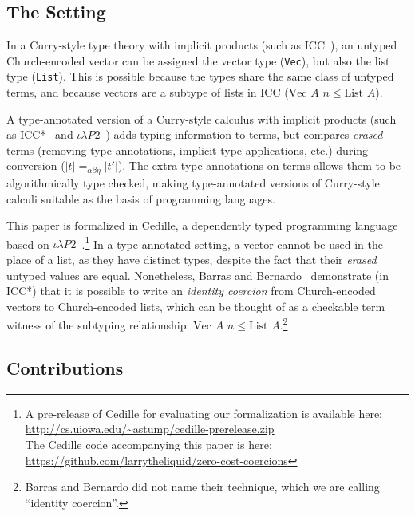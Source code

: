 \documentclass[a4paper,envcountsame,envcountsect]{llncs}
\newcommand{\earg}[1]{\,\,#1}
\newcommand{\subtp}[0]{\leq}
\newcommand{\cdle}[0]{\ensuremath{\iota \lambda P2}~}
\newcommand{\erase}[1]{\ensuremath{\lvert #1 \rvert}}
\newcommand{\name}[1]{\textrm{#1}}
\begin{document}
\subsection{The Setting}

In a Curry-style type theory with implicit
products (such as ICC~\cite{miquel:implicit}),
an untyped Church-encoded vector can be assigned
the vector type (\texttt{Vec}),
but also the list type (\texttt{List}).
This is possible because the types share the same class of untyped
terms, and because vectors are a subtype of lists in ICC
($\name{Vec} \earg A \earg n \subtp \name{List} \earg A$).

A type-annotated version of a Curry-style
calculus with implicit products
(such as ICC*~\cite{barras:implicit} and
\cdle\cite{stump17b}) adds typing information to terms, but compares
\textit{erased} terms (removing type annotations, implicit type
applications, etc.) during conversion
($\erase{t} =_{\alpha\beta\eta} \erase{t'}$).
The extra type annotations on terms allows them
to be algorithmically type checked, making type-annotated versions of
Curry-style calculi suitable as the basis of programming languages.

This paper is formalized in Cedille, a dependently typed programming
language based on \cdle.\footnote{\raggedright{A pre-release of Cedille for
evaluating our formalization is available here:\\
\url{http://cs.uiowa.edu/~astump/cedille-prerelease.zip}}\\
  The Cedille code accompanying this paper is here:\\
  \url{https://github.com/larrytheliquid/zero-cost-coercions}}
In a type-annotated setting, a vector cannot be used in
the place of a list, as they have distinct types, despite the fact that
their \textit{erased} untyped values are equal.
Nonetheless, Barras and Bernardo~\cite{barras:implicit} demonstrate
(in ICC*) that it is possible to write an \textit{identity coercion} from
Church-encoded vectors to Church-encoded lists, which can be thought
of as a checkable term witness of the subtyping relationship:
$\name{Vec} \earg A \earg n \subtp \name{List} \earg
A$.\footnote{Barras and Bernardo did not name their technique, which
  we are calling ``identity coercion''.
  }

\subsection{Contributions}
\end{document}
